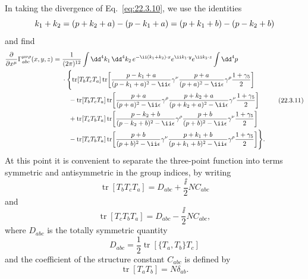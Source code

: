 In taking the divergence of Eq.~\eqref{eq:22.3.10}, we use the identities
\[
 \sl{k}_1+\sl{k}_2
 =(\sl{p}+\sl{k}_2+\sl{a})-(\sl{p}-\sl{k}_1+\sl{a})
 =(\sl{p}+\sl{k}_1+\sl{b})-(\sl{p}-\sl{k}_2+\sl{b})
\]
and find
\begin{equation}
 \begin{aligned}
 \frac{\partial}{\partial x^\mu}
 \Gamma_{abc}^{\mu\nu\rho}(x,y,z)
 ={}&\frac{1}{(2\pi)^{12}}
 \int \dd^4k_1\,\dd^4k_2\,
 e^{-\ii(k_1+k_2)\cdot x}e^{\ii k_1\cdot y}e^{\ii k_2\cdot z}
 \int \dd^4p
 \\
 &\cdot\Biggl\{
 \operatorname{tr}[T_b T_c T_a]
 \operatorname{tr}\!\left[
  \frac{\sl{p}-\sl{k}_1+\sl{a}}{(p-k_1+a)^2-\ii\epsilon}\gamma^\nu
  \frac{\sl{p}+\sl{a}}{(p+a)^2-\ii\epsilon}\gamma^\rho
  \frac{1+\gamma_5}{2}
 \right]
 \\
 &\quad-\operatorname{tr}[T_b T_c T_a]
 \operatorname{tr}\!\left[
  \frac{\sl{p}+\sl{a}}{(p+a)^2-\ii\epsilon}\gamma^\rho
  \frac{\sl{p}+\sl{k}_2+\sl{a}}{(p+k_2+a)^2-\ii\epsilon}\gamma^\nu
  \frac{1+\gamma_5}{2}
 \right]
 \\
 &\quad+\operatorname{tr}[T_c T_b T_a]
 \operatorname{tr}\!\left[
  \frac{\sl{p}-\sl{k}_2+\sl{b}}{(p-k_2+b)^2-\ii\epsilon}\gamma^\rho
  \frac{\sl{p}+\sl{b}}{(p+b)^2-\ii\epsilon}\gamma^\nu
  \frac{1+\gamma_5}{2}
 \right]
 \\
 &\quad-\operatorname{tr}[T_c T_b T_a]
 \operatorname{tr}\!\left[
  \frac{\sl{p}+\sl{b}}{(p+b)^2-\ii\epsilon}\gamma^\nu
  \frac{\sl{p}+\sl{k}_1+\sl{b}}{(p+k_1+b)^2-\ii\epsilon}\gamma^\rho
  \frac{1+\gamma_5}{2}
 \right]
 \Biggr\}.
 \end{aligned}
 \tag{22.3.11}\label{eq:22.3.11}
\end{equation}
At this point it is convenient to separate the three-point function into
terms symmetric and antisymmetric in the group indices, by writing
\[
 \operatorname{tr}[T_b T_c T_a]
 =D_{abc}+\frac{\ii}{2}NC_{abc}
\]
and
\[
 \operatorname{tr}[T_c T_b T_a]
 =D_{abc}-\frac{\ii}{2}NC_{abc},
\]
where $D_{abc}$ is the totally symmetric quantity
\begin{equation}
 D_{abc}
 =\frac12\operatorname{tr}\!\left[\{T_a,T_b\}T_c\right]
 \tag{22.3.12}\label{eq:22.3.12}
\end{equation}
and the coefficient of the structure constant $C_{abc}$ is
defined by
\[
 \operatorname{tr}[T_a T_b]=N\delta_{ab}.
\]

